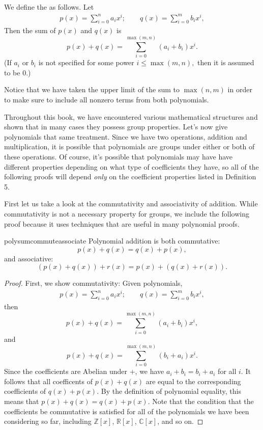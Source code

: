\begin {defn}
We define the  as follows.  Let
\begin{align*}
p(x)  = \sum^{n}_{i=0} a_i x^i ; \qquad
q(x)  = \sum^{m}_{i=0} b_i x^i,
\end{align*}
Then the sum of $p(x)$ and $q(x)$ is
\[
p(x) + q(x) =  \sum_{i=0}^{\max(m,n)} (a_i + b_i) x^i.
\]
(If $a_i$ or $b_i$ is not specified for some power $i \leq \max(m,n),$ then it is assumed to be 0.)
  
\end{defn}
Notice that we have taken the upper limit of the sum to $\max(n,m)$ in order to make sure to include all nonzero terms from both polynomials. 

Throughout this book, we have encountered various mathematical structures and shown that in many cases they possess group properties. Let's now give polynomials that same treatment. Since we have two operations, addition and multiplication, it is possible that polynomials are groups under either or both of these operations. Of course, it's possible that polynomials may have have different properties depending on what type of coefficients they have, so all of the following proofs will depend \emph{only} on the coefficient properties listed in Definition 5.  

First let us take a look at the commutativity and associativity of addition.  While commutativity is not a necessary property for groups, we include the following proof because it uses techniques that are useful in many polynomial proofs.

\begin {prop}{polysumcommuteassociate} Polynomial addition is both commutative: 
	\[p(x)+q(x) = q(x) + p(x),\]	
and associative:	
	\[(p(x) + q(x)) + r(x)  = p(x) + (q(x) + r(x)).\]	
\end {prop}
\begin {proof}{}
First, we show commutativity:	
Given polynomials,
\begin{align*}
p(x)  = \sum^{n}_{i=0} a_i x^i; \qquad
q(x)  = \sum^{m}_{i=0} b_i x^i,
\end{align*}	
then 
\[
p(x) + q(x) =  \sum_{i=0}^{\max(m,n)} (a_i + b_i) x^i,
\]
and
\[
p(x) + q(x) =  \sum_{i=0}^{\max(m,n)} (b_i + a_i) x^i.
\]
Since the coefficients are Abelian under +, we have $a_i + b_i = b_i + a_i$ for all $i$. It follows that all coefficents of $p(x) + q(x)$ are equal to the corresponding coefficients of $q(x) + p(x)$. By the definition of polynomial equality, this means that 
$p(x) + q(x) = q(x) + p(x)$.  Note that the condition that the coefficients be commutative is satisfied for all of the polynomials we have been considering so far, including $\mathbb{Z}[x]$, $\mathbb{R}[x]$, $\mathbb{C}[x]$, and so on.

\end {proof}

